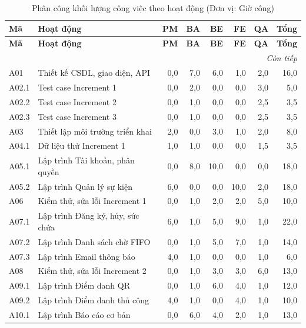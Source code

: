\begingroup\small
\setlength{\tabcolsep}{4pt}\renewcommand{\arraystretch}{1.15}
\begin{longtable}{@{}lp{.30\linewidth}*{6}{r}@{}}
\caption{Phân công khối lượng công việc theo hoạt động (Đơn vị: Giờ công)}\label{tab:allocation}\\
\toprule
\textbf{Mã} & \textbf{Hoạt động} & \textbf{PM} & \textbf{BA} & \textbf{BE} & \textbf{FE} & \textbf{QA} & \textbf{Tổng} \\
\midrule\endfirsthead
\toprule
\textbf{Mã} & \textbf{Hoạt động} & \textbf{PM} & \textbf{BA} & \textbf{BE} & \textbf{FE} & \textbf{QA} & \textbf{Tổng} \\
\midrule\endhead
\midrule\multicolumn{8}{r}{\textit{Còn tiếp}}\\\endfoot
\bottomrule\endlastfoot
A01 & Thiết kế CSDL, giao diện, API & 0,0 & 7,0 & 6,0 & 1,0 & 2,0 & 16,0 \\
A02.1 & Test case Increment 1 & 0,0 & 2,0 & 0,0 & 0,0 & 3,0 & 5,0 \\
A02.2 & Test case Increment 2 & 0,0 & 1,0 & 0,0 & 0,0 & 2,5 & 3,5 \\
A02.3 & Test case Increment 3 & 0,0 & 1,0 & 0,0 & 0,0 & 2,5 & 3,5 \\
A03 & Thiết lập môi trường triển khai & 2,0 & 0,0 & 3,0 & 1,0 & 2,0 & 8,0 \\
A04.1 & Dữ liệu thử Increment 1 & 1,0 & 1,0 & 0,0 & 0,0 & 1,5 & 3,5 \\
A05.1 & Lập trình Tài khoản, phân quyền & 0,0 & 8,0 & 10,0 & 0,0 & 0,0 & 18,0 \\
A05.2 & Lập trình Quản lý sự kiện & 6,0 & 0,0 & 0,0 & 10,0 & 2,0 & 18,0 \\
A06 & Kiểm thử, sửa lỗi Increment 1 & 0,0 & 1,0 & 2,0 & 2,0 & 5,0 & 10,0 \\
A07.1 & Lập trình Đăng ký, hủy, sức chứa & 6,0 & 1,0 & 5,0 & 9,0 & 1,0 & 22,0 \\
A07.2 & Lập trình Danh sách chờ FIFO & 0,0 & 1,0 & 5,0 & 7,0 & 1,0 & 14,0 \\
A07.3 & Lập trình Email thông báo & 4,0 & 1,0 & 0,0 & 0,0 & 1,0 & 6,0 \\
A08 & Kiểm thử, sửa lỗi Increment 2 & 0,0 & 1,0 & 3,0 & 3,0 & 6,0 & 13,0 \\
A09.1 & Lập trình Điểm danh QR & 0,0 & 1,0 & 6,0 & 4,0 & 1,0 & 12,0 \\
A09.2 & Lập trình Điểm danh thủ công & 4,0 & 1,0 & 0,0 & 4,0 & 1,0 & 10,0 \\
A10.1 & Lập trình Báo cáo cơ bản & 0,0 & 6,0 & 4,0 & 2,0 & 1,0 & 13,0 \\

\end{longtable}
